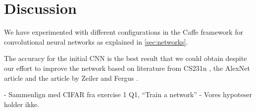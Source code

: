 \graphicspath{{Chapters/Project/}}

\section{Discussion} %
\label{sec:discussion}

We have experimented with different configurations in the Caffe framework for convolutional neural
networks as explained in \autoref{sec:networks}.  
 
 
The accuracy for the initial CNN is the best result that we could obtain despite
our effort to improve the network based on literature from CS231n \cite{cs231n},
the AlexNet article\cite{AlexNet} and the article by Zeiler and Fergus
\cite{ZeilerFergus}.


- Sammenlign med CIFAR fra exercise 1 Q1, ``Train a network'' 
- Vores hypoteser holder ikke. 


